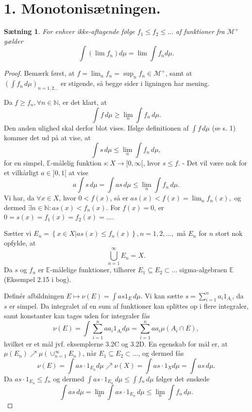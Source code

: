 \documentclass[12pt]{report}
\newtheorem{theorem}[lemma]{Sætning}
\theoremstyle{break}
\newtheorem*{proof}{Bevis}
\theoremstyle{break}
\newcommand{\EE}{\mathbb{E}}
\newcommand{\M}{\mathcal{M}^+}
\newcommand{\1}{\mathds{1}}
\begin{document}
\section*{1. Monotonisætningen.}
\begin{theorem}
For enhver ikke-aftagende følge $f_1\leq f_2\leq\ldots$ af funktioner fra $\M$ gælder
\[\int(\lim f_n)d\mu = \lim\int f_n d\mu.\]
\end{theorem}
\begin{proof}
Bemærk først, at $f=\lim_nf_n =\sup_nf_n\in\M$, samt at $(\int f_n\, d\mu)_ {n=1,2\ldots}$ er stigende, så begge sider i ligningen har mening.

\bigskip

Da $f\geq f_n, \forall n\in\mathbb{N}$, er det klart, at 
\[\int f\, d\mu\geq\lim\limits_{n}\int f_n\, d\mu.\]
Den anden ulighed skal derfor blot vises. Ifølge definitionen af $\int f\, d\mu$ (se s. 1) kommer det ud på at vise, at 
\[\int s\, d\mu\leq\lim\limits_{n}\int f_n\, d\mu,\]
for en simpel, $\EE$-målelig funktion $s\colon X\to [0,\infty[$, hvor $s\leq f$. - Det vil være nok for et vilkårligt $a\in]0,1[$ at vise
\[a\int s\, d\mu = \int as\, d\mu\leq\lim\limits_{n}\int f_n\, d\mu.\]
Vi har, da $\forall x\in X$, hvor $0<f(x)$, så er $as(x)<f(x)=\lim_nf_n(x),$ og dermed $\exists n\in\mathbb{N}\colon as(x)<f_n(x)$. For $f(x)=0$, er $0=s(x)=f_1(x)=f_2(x)=\ldots$.

\bigskip

Sætter vi $E_n = \left\{ x \in X|as(x) \leqslant f_n(x) \right\},n = 1,2, \ldots,$ må $E_n$ for $n$ stort nok opfylde, at
\[\bigcup\limits_{n = 1}^\infty  {{E_n}}  = X.\]
Da $s$ og $f_n$ er $\EE$-målelige funktioner, tilhører $E_1\subseteq E_2\subset\ldots$ sigma-algebraen $\EE$ (Eksempel 2.15 i bog).

\bigskip

Definér afbildningen $E\mapsto\nu(E)=\int as1_E\, d\mu$. Vi kan sætte $s = \sum\nolimits_{i = 1}^n {{a_i}{1_{{A_i}}}}$, da $s$ er simpel. Da integralet af en sum af funktioner kan splittes op i flere integraler, samt konstanter kan tages uden for integraler fås
\[\nu (E) = \int {\sum\limits_{i = 1}^n {a{a_i}{1_{{A_i}}}} } d\mu  = \sum\limits_{i = 1}^n {a{a_i}\mu ({A_i} \cap E)}, \]
hvilket er et mål jvf. eksemplerne 3.2C og 3.2D. En egenskab for mål er, at $\mu(E_n)\nearrow\mu\left(\cup^{\infty}_{n=1}E_n\right)$, når $E_1\subseteq E_2\subset\ldots$, og dermed fås
\[\nu (E) = \int {as\cdot{1_{{E_n}}}} d\mu  \nearrow \nu (X) = \int {as\cdot{1_X}} d\mu  = \int {as} \,d\mu. \]
Da $as\cdot 1_{E_n}\leq f_n$ og dermed $\int as\cdot 1_{E_n}\, d\mu\leq\int f_n\, d\mu$ følger det ønskede
\[\int as\, d\mu = \lim\limits_{n}\int as\cdot 1_{E_n}\, d\mu\leq\lim\limits_{n}\int f_n\, d\mu.\]
\end{proof}
\newpage
\end{document}
